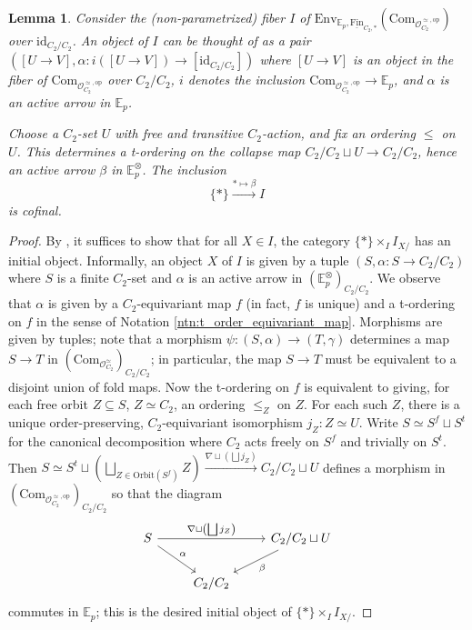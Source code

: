 \documentclass{article}
\newcommand{\EE}{\mathbb{E}}
\newcommand{\op}{\mathrm{op}}
\newcommand{\Fin}{\mathrm{Fin}} %
\newtheorem{lemma}[equation]{Lemma}
\theoremstyle{definition}
\begin{document}
\begin{lemma}\label{lemma:freeoperadic_calgp_colimdiagram}
    Consider the (non-parametrized) fiber $ I $ of $ \mathrm{Env}_{\EE_p, \underline{\Fin}_{C_2,*}}\left(\mathrm{Com}_{\mathcal{O}_{C_2}^{\simeq,\op}}\right) $ over $ \mathrm{id}_{C_2/C_2} $. 
    An object of $ I $ can be thought of as a pair $ \left([U \to V], \alpha \colon i([U \to V]) \to [\mathrm{id}_{C_2/C_2}]\right)$ where $ [U \to V ] $ is an object in the fiber of $ \mathrm{Com}_{\mathcal{O}_{C_2}^{\simeq,\op}} $ over $ C_2/C_2 $, $ i $ denotes the inclusion $ \mathrm{Com}_{\mathcal{O}_{C_2}^{\simeq,\op}} \to \EE_p $, and $ \alpha $ is an active arrow in $ \EE_p $. 

    Choose a $ C_2 $-set $ U $ with free and transitive $ C_2 $-action, and fix an ordering $ \leq $ on $ U $. 
    This determines a t-ordering on the collapse map $ C_2/C_2 \sqcup U \to C_2/C_2 $, hence an active arrow $ \beta $ in $ \EE_p^\otimes $. 
    The inclusion
    \begin{equation*}
        \{*\} \xrightarrow{* \mapsto \beta} I
    \end{equation*}
    is cofinal. 
\end{lemma}
\begin{proof}
    By \cite[Theorem 4.1.3.1]{HTT}, it suffices to show that for all $ X \in I $, the category $ \{*\} \times_{I} I_{X/} $ has an initial object. 
    Informally, an object $ X $ of $ I $ is given by a tuple $ (S, \alpha \colon S \to C_2/C_2) $ where $ S $ is a finite $ C_2 $-set and $ \alpha $ is an active arrow in $ \left(\EE_p^\otimes\right)_{C_2/C_2} $. 
    We observe that $ \alpha $ is given by a $ C_2 $-equivariant map $ f $ (in fact, $ f $ is unique) and a t-ordering on $ f $ in the sense of Notation \ref{ntn:t_order_equivariant_map}. 
    Morphisms are given by tuples; note that a morphism $ \psi \colon (S,\alpha) \to (T,\gamma) $ determines a map $ S \to T $ in $ \left(\mathrm{Com}_{\mathcal{O}_{C_2}^\simeq}\right)_{C_2/C_2} $; in particular, the map $ S \to T $ must be equivalent to a disjoint union of fold maps. 
    Now the t-ordering on $ f $ is equivalent to giving, for each free orbit $ Z \subseteq S $, $ Z \simeq C_2 $, an ordering $ \leq_Z $ on $ Z $. 
    For each such $ Z $, there is a unique order-preserving, $ C_2 $-equivariant isomorphism $ j_Z \colon Z \simeq U $. 
    Write $ S \simeq S^f \sqcup S^t $ for the canonical decomposition where $ C_2 $ acts freely on $ S^f $ and trivially on $ S^t $. 
    Then $ \displaystyle S \simeq S^t \sqcup \left(\bigsqcup_{Z \in \mathrm{Orbit}(S^f)} Z\right) \xrightarrow{\nabla \sqcup \left(\bigsqcup j_Z\right)} C_2/C_2 \sqcup U $ defines a morphism in $ \left(\mathrm{Com}_{\mathcal{O}_{C_2}^{\simeq,\op}}\right)_{C_2/C_2} $ so that the diagram
    \begin{equation*}
    \begin{tikzcd}
        S \ar[rr,"{\nabla \sqcup \left(\bigsqcup j_Z\right)}"] \ar[rd,"\alpha"] & & C_2/C_2 \sqcup U\ar[ld,"{\beta}"] \\
        & C_2/C_2 &         
    \end{tikzcd}     
    \end{equation*} 
    commutes in $ \EE_p $; this is the desired initial object of $ \{*\} \times_{I} I_{X/} $.  
\end{proof}
\end{document}
